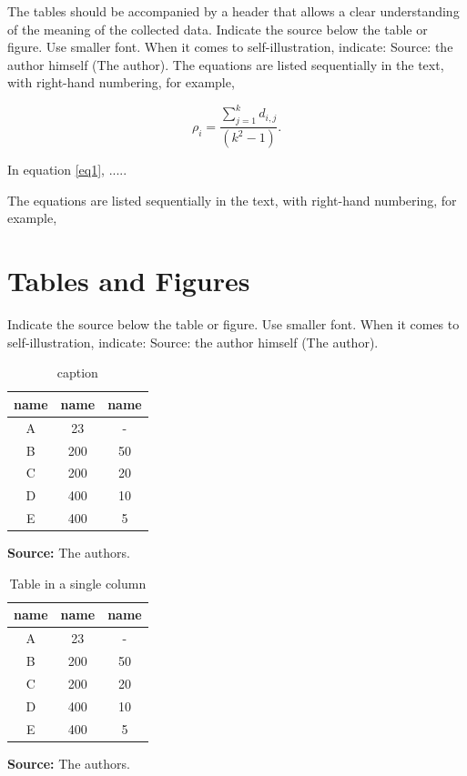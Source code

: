 \documentclass[article,10pt,twoside,a4paper,twocolumn,hidelinks,english,brazil]{abntex2}
\begin{document}
The tables should be accompanied by a header that allows a clear understanding of the meaning of the collected data.
Indicate the source below the table or figure. Use smaller font. When it comes to self-illustration, indicate: Source: the author himself (The author).
      The equations are listed sequentially in the text, with right-hand numbering, for example,

\begin{equation}
\label{eq1}
\rho_i=\frac{\sum^{k}_{j=1} d_{i,j}}{(k^2-1)}.
\end{equation}

In equation \ref{eq1}, .....




      The equations are listed sequentially in the text, with right-hand numbering, for example,
%


\section*{Tables and Figures }

Indicate the source below the table or figure. Use smaller font. When it comes to self-illustration, indicate: Source: the author himself (The author).


\begin{table}[!htpp]
	\vspace{0.3cm}
  \caption{ caption }
	\vspace{-0.6cm}
	\label{tab01}
	\renewcommand{\arraystretch}{1.2}
	\begin{center}
\begin{tabular}{ccc}
\hline
\textbf{name } &	\textbf{name  }	& \textbf{name }\\
\hline		
A	&23	&- \\
B	&200	&50\\
C	&200	&20\\
D	&400	&10\\
E	&400	&5\\
\hline
\end{tabular}
\end{center}
\small\textbf{Source:} The authors.
\end{table}


\begin{table}[!htpp]
	\vspace{0.3cm}
  \caption{ Table in a single column }
	\vspace{-0.6cm}
	\label{tab02} %
	\renewcommand{\arraystretch}{1.2}
	\begin{center}
\begin{tabular}{ccc}
\hline
\textbf{name } &	\textbf{name  }	& \textbf{name }\\
\hline		
A	&23	&- \\
B	&200	&50\\
C	&200	&20\\
D	&400	&10\\
E	&400	&5\\
\hline
\end{tabular}
\end{center}
\small\textbf{Source:} The authors.
\end{table}
\end{document}

